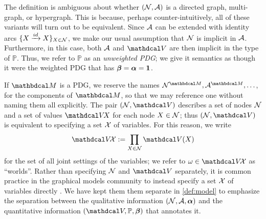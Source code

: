 \begin{defn}
The definition is ambiguous about whether $(\mathcal N, \mathcal A)$ is a directed graph, multi-graph, or hypergraph. This is because, perhaps counter-intuitively, all of these variants will turn out to be equivalent.
Since $\mathcal A$ can be extended with identity arcs $\{ X \xrightarrow{id} X \}_{X\in \mathcal N}$, we make our usual assumption that $\mathcal N$ is implicit in $\mathcal A$. Furthermore, in this case, both $\mathcal A$ and $\V$ are then implicit in the type of $\mathbb P$. 
Thus, we refer to $\mathbb P$ as an \emph{unweighted PDG};
	we give it semantics as though it were the weighted PDG that has $\boldsymbol\beta = \boldsymbol\alpha = \mathbf 1$. 
\end{defn}

If $\dg M$ is a PDG, we reserve the names 
$\N^{\dg M}, \Ar^{\dg M}, \ldots$,
for the components of $\dg M$, so that we may reference one without naming them
all explicitly.
The pair $(\N, \V)$ describes a set of nodes $\mathcal N$ and a set of values $\V\!X$ for each node $X \in \mathcal N$;
    thus $(\N,\V)$ is equivalent to specifying a set $\mathcal X$ of variables.
For this reason, we write 
\[
    \V\!\X := \prod_{X \in \N} \V(X)
\]
for the set of all joint settings of the variables; we refer to $\omega \in \V\!\X$ as ``worlds''.
Rather than specifying $\mathcal N$ and $\V$ separately, it is common practice in the graphical models community to instead specify a set $\mathcal X$ of variables directly \citep{koller2009probabilistic}.
We have kept them them separate in \cref{def:model} to emphasize the separation between the qualitative information $(\mathcal N, \mathcal A, \boldsymbol\alpha)$ and the quantitative information $(\V, \mathbb P, \bbeta)$ that annotates it. 

